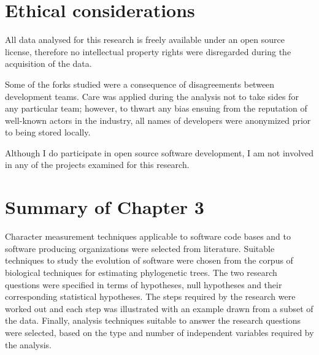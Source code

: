 \section{Ethical considerations}
\label{ethical_considerations}

All data analysed for this research is freely available under an open source license, therefore no intellectual property rights were disregarded during the acquisition of the data. 

Some of the forks studied were a consequence of disagreements between development teams. Care was applied during the analysis not to take sides for any particular team; however, to thwart any bias ensuing from the reputation of well-known actors in the industry, all names of developers were anonymized prior to being stored locally.

Although I do participate in open source software development, I am not involved in any of the projects examined for this research.
\section{Summary of Chapter 3}
Character measurement techniques applicable to software code bases and to software producing organizations were selected from literature. Suitable techniques to study the evolution of software were chosen from the corpus of biological techniques for estimating phylogenetic trees. The two research questions were specified in terms of hypotheses, null hypotheses and their corresponding statistical hypotheses. The steps required by the research were worked out and each step was illustrated with an example drawn from a subset of the data. Finally, analysis techniques suitable to answer the research questions were selected, based on the type and number of independent variables required by the analysis.


